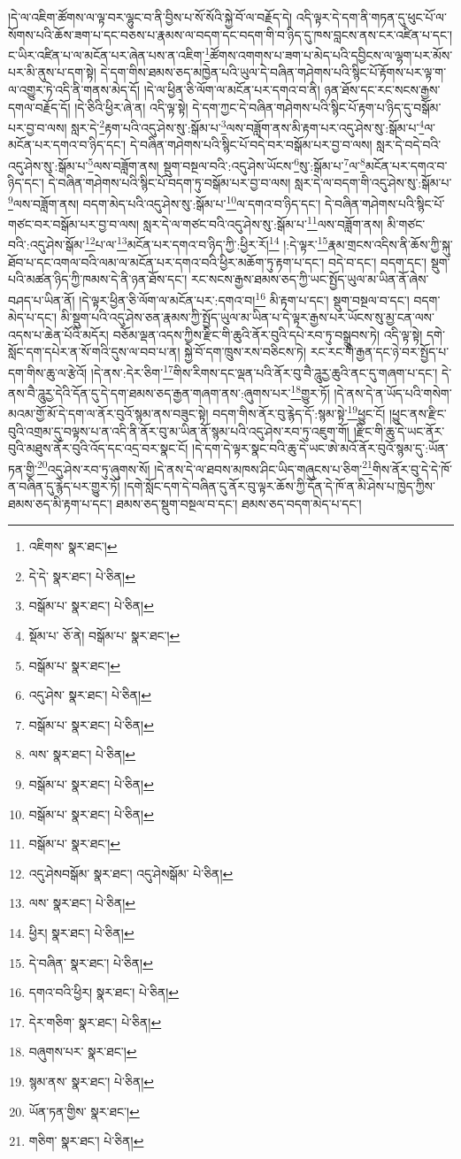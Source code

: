 །དེ་ལ་འཇིག་ཚོགས་ལ་ལྟ་བར་ལྷུང་བ་ནི་བྱིས་པ་སོ་སོའི་སྐྱེ་བོ་ལ་བརྗོད་དེ། འདི་ལྟར་དེ་དག་ནི་གཏན་དུ་ཕུང་པོ་ལ་སོགས་པའི་ཆོས་ཟག་པ་དང་བཅས་པ་རྣམས་ལ་བདག་དང་བདག་གི་བ་ཉིད་དུ་ཁས་བླངས་ནས་ངར་འཛིན་པ་དང་། ང་ཡིར་འཛིན་པ་ལ་མངོན་པར་ཞེན་པས་ན་འཇིག་\footnote{འཇིགས་  སྣར་ཐང་། }ཚོགས་འགགས་པ་ཟག་པ་མེད་པའི་དབྱིངས་ལ་ལྷག་པར་མོས་པར་མི་ནུས་པ་དག་སྟེ། དེ་དག་གིས་ཐམས་ཅད་མཁྱེན་པའི་ཡུལ་དེ་བཞིན་གཤེགས་པའི་སྙིང་པོ་རྟོགས་པར་ལྟ་ག་ལ་འགྱུར་ཏེ་འདི་ནི་གནས་མེད་དོ། །དེ་ལ་ཕྱིན་ཅི་ལོག་ལ་མངོན་པར་དགའ་བ་ནི། ཉན་ཐོས་དང་རང་སངས་རྒྱས་དགལ་བརྗོད་དོ། །དེ་ཅིའི་ཕྱིར་ཞེ་ན། འདི་ལྟ་སྟེ། དེ་དག་ཀྱང་དེ་བཞིན་གཤེགས་པའི་སྙིང་པོ་རྟག་པ་ཉིད་དུ་བསྒོམ་པར་བྱ་བ་ལས། སླར་དེ་\footnote{དེ་དེ་  སྣར་ཐང་།  པེ་ཅིན། }རྟག་པའི་འདུ་ཤེས་སུ་:སྒོམ་པ་\footnote{བསྒོམ་པ་  སྣར་ཐང་།  པེ་ཅིན། }ལས་བཟློག་ནས་མི་རྟག་པར་འདུ་ཤེས་སུ་:སྒོམ་པ་\footnote{སྡོམ་པ་  ཅོ་ནེ། བསྒོམ་པ་  སྣར་ཐང་། }ལ་མངོན་པར་དགའ་བ་ཉིད་དང་། དེ་བཞིན་གཤེགས་པའི་སྙིང་པོ་བདེ་བར་བསྒོམ་པར་བྱ་བ་ལས། སླར་དེ་བདེ་བའི་འདུ་ཤེས་སུ་:སྒོམ་པ་\footnote{བསྒོམ་པ་  སྣར་ཐང་། }ལས་བཟློག་ནས། སྡུག་བསྔལ་བའི་:འདུ་ཤེས་ཡོངས་\footnote{འདུ་ཤེས་  སྣར་ཐང་།  པེ་ཅིན། }སུ་:སྒོམ་པ་\footnote{བསྒོམ་པ་  སྣར་ཐང་།  པེ་ཅིན། }ལ་\footnote{ལས་  སྣར་ཐང་།  པེ་ཅིན། }མངོན་པར་དགའ་བ་ཉིད་དང་། དེ་བཞིན་གཤེགས་པའི་སྙིང་པོ་བདག་ཏུ་བསྒོམ་པར་བྱ་བ་ལས། སླར་དེ་ལ་བདག་གི་འདུ་ཤེས་སུ་:སྒོམ་པ་\footnote{བསྒོམ་པ་  སྣར་ཐང་།  པེ་ཅིན། }ལས་བཟློག་ནས། བདག་མེད་པའི་འདུ་ཤེས་སུ་:སྒོམ་པ་\footnote{བསྒོམ་པ་  སྣར་ཐང་།  པེ་ཅིན། }ལ་དགའ་བ་ཉིད་དང་། དེ་བཞིན་གཤེགས་པའི་སྙིང་པོ་གཙང་བར་བསྒོམ་པར་བྱ་བ་ལས། སླར་དེ་ལ་གཙང་བའི་འདུ་ཤེས་སུ་:སྒོམ་པ་\footnote{བསྒོམ་པ་  སྣར་ཐང་། }ལས་བཟློག་ནས། མི་གཙང་བའི་:འདུ་ཤེས་སྒོམ་\footnote{འདུ་ཤེསབསྒོམ་  སྣར་ཐང་། འདུ་ཤེསསྒོམ་  པེ་ཅིན། }པ་ལ་\footnote{ལས་  སྣར་ཐང་།  པེ་ཅིན། }མངོན་པར་དགའ་བ་ཉིད་ཀྱི་:ཕྱིར་རོ།\footnote{ཕྱིར།  སྣར་ཐང་།  པེ་ཅིན། } །:དེ་ལྟར་\footnote{དེ་བཞིན་  སྣར་ཐང་།  པེ་ཅིན། }རྣམ་གྲངས་འདིས་ནི་ཆོས་ཀྱི་སྐུ་ཐོབ་པ་དང་འགལ་བའི་ལམ་ལ་མངོན་པར་དགའ་བའི་ཕྱིར་མཆོག་ཏུ་རྟག་པ་དང་། བདེ་བ་དང་། བདག་དང་། སྡུག་པའི་མཚན་ཉིད་ཀྱི་ཁམས་དེ་ནི་ཉན་ཐོས་དང་། རང་སངས་རྒྱས་ཐམས་ཅད་ཀྱི་ཡང་སྤྱོད་ཡུལ་མ་ཡིན་ནོ་ཞེས་བཤད་པ་ཡིན་ནོ། །དེ་ལྟར་ཕྱིན་ཅི་ལོག་ལ་མངོན་པར་:དགའ་བ།\footnote{དགའ་བའི་ཕྱིར།  སྣར་ཐང་།  པེ་ཅིན། } མི་རྟག་པ་དང་། སྡུག་བསྔལ་བ་དང་། བདག་མེད་པ་དང་། མི་སྡུག་པའི་འདུ་ཤེས་ཅན་རྣམས་ཀྱི་སྤྱོད་ཡུལ་མ་ཡིན་པ་དེ་ལྟར་རྒྱས་པར་ཡོངས་སུ་མྱ་ངན་ལས་འདས་པ་ཆེན་པོའི་མདོར། བཅོམ་ལྡན་འདས་ཀྱིས་རྫིང་གི་ཆུའི་ནོར་བུའི་དཔེ་རབ་ཏུ་བསྒྲུབས་ཏེ། འདི་ལྟ་སྟེ། དགེ་སློང་དག་དཔེར་ན་སོ་གའི་དུས་ལ་བབ་པ་ན། སྐྱེ་བོ་དག་ཁྲུས་རས་བཅིངས་ཏེ། རང་རང་གི་རྒྱན་དང་ཉེ་བར་སྤྱོད་པ་དག་གིས་ཆུ་ལ་རྩེའོ། །དེ་ནས་:དེར་ཅིག་\footnote{དེར་གཅིག་  སྣར་ཐང་།  པེ་ཅིན། }གིས་རིགས་དང་ལྡན་པའི་ནོར་བུ་བཻ་ཌཱུརྱ་ཆུའི་ནང་དུ་གཞག་པ་དང་། དེ་ནས་བཻ་ཌཱུརྱ་དེའི་དོན་དུ་དེ་དག་ཐམས་ཅད་རྒྱན་གཞག་ནས་:ཞུགས་པར་\footnote{བཞུགས་པར་  སྣར་ཐང་། }གྱུར་ཏོ། །དེ་ནས་དེ་ན་ཡོད་པའི་གསེག་མའམ་གྱོ་མོ་དེ་དག་ལ་ནོར་བུའོ་སྙམ་ནས་བཟུང་སྟེ། བདག་གིས་ནོར་བུ་རྙེད་དོ་:སྙམ་སྟེ་\footnote{སྙམ་ནས་  སྣར་ཐང་།  པེ་ཅིན། }ཕྱུང་ངོ། །ཕྱུང་ནས་རྫིང་བུའི་འགྲམ་དུ་བལྟས་པ་ན་འདི་ནི་ནོར་བུ་མ་ཡིན་ནོ་སྙམ་པའི་འདུ་ཤེས་རབ་ཏུ་འཇུག་གོ། །རྫིང་གི་ཆུ་དེ་ཡང་ནོར་བུའི་མཐུས་ནོར་བུའི་འོད་དང་འདྲ་བར་སྣང་ངོ། །དེ་དག་དེ་ལྟར་སྣང་བའི་ཆུ་དེ་ཡང་ཨེ་མའོ་ནོར་བུའོ་སྙམ་དུ་:ཡོན་ཏན་གྱི་\footnote{ཡོན་ཏན་གྱིས་  སྣར་ཐང་། }འདུ་ཤེས་རབ་ཏུ་ཞུགས་སོ། །དེ་ནས་དེ་ལ་ཐབས་མཁས་ཤིང་ཡིད་གཞུངས་པ་ཅིག་\footnote{གཅིག་  སྣར་ཐང་།  པེ་ཅིན། }གིས་ནོར་བུ་དེ་དེ་ཁོ་ན་བཞིན་དུ་རྙེད་པར་གྱུར་ཏོ། །དགེ་སློང་དག་དེ་བཞིན་དུ་ནོར་བུ་ལྟར་ཆོས་ཀྱི་དོན་དེ་ཁོ་ན་མི་ཤེས་པ་ཁྱེད་ཀྱིས་ཐམས་ཅད་མི་རྟག་པ་དང་། ཐམས་ཅད་སྡུག་བསྔལ་བ་དང་། ཐམས་ཅད་བདག་མེད་པ་དང་། 